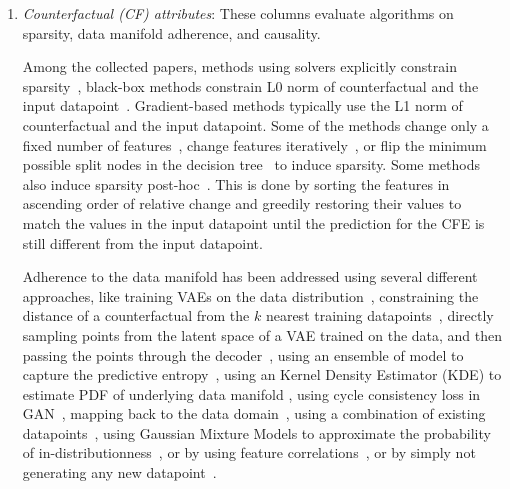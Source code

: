 \begin{enumerate}[leftmargin=*]
    \item \emph{Counterfactual (CF) attributes}: These columns evaluate algorithms on sparsity, data manifold adherence, and causality. 
    
    Among the collected papers, methods using solvers explicitly constrain sparsity~\citep{Ustun19:Actionable,karimi_model-agnostic_2020}, black-box methods constrain L0 norm of counterfactual and the input datapoint~\citep{medina_comparison-based_2018,dandl_multi-objective_2020}. 
    Gradient-based methods typically use the L1 norm of counterfactual and the input datapoint. 
    Some of the methods change only a fixed number of features~\citep{white_measurable_2019,keane2020good}, change features iteratively~\citep{Grace:2019,Epistemic_and_Aleatoric_uncertainty, verma2021amortized, Gradual_Construction}, or flip the minimum possible split nodes in the decision tree~\citep{guidotti_local_2018} to induce sparsity. 
    Some methods also induce sparsity post-hoc~\citep{medina_comparison-based_2018,mothilal_explaining_2020}. 
    This is done by sorting the features in ascending order of relative change and greedily restoring their values to match the values in the input datapoint until the prediction for the CFE is still different from the input datapoint.
    
    Adherence to the data manifold has been addressed using several different approaches, like training VAEs on the data distribution~\citep{dhurandhar_explanations_2018,joshi_towards_2019,van_looveren_interpretable_2020,mahajan_preserving_2020}, constraining the distance of a counterfactual from the $k$ nearest training datapoints~\citep{dandl_multi-objective_2020,Kanamori2020:DACE, prototype_based_cfe}, directly sampling points from the latent space of a VAE trained on the data, and then passing the points through the decoder~\citep{pawelczyk_learning_2020}, using an ensemble of model to capture the predictive entropy~\citep{Epistemic_and_Aleatoric_uncertainty}, using an Kernel Density Estimator (KDE) to estimate PDF of underlying data manifold \citep{coherent_CFEs}, using cycle consistency loss in GAN~\citep{conditional_gan_cfe_looveren}, mapping back to the data domain~\citep{Grace:2019}, using a combination of existing datapoints~\citep{keane2020good}, using Gaussian Mixture Models to approximate the probability of in-distributionness~\citep{efficient-contrastive}, or by using feature correlations~\citep{convex_optimization_cfe}, or by simply not generating any new datapoint~\citep{poyiadzi_face_2020}. 
    

\end{enumerate}
